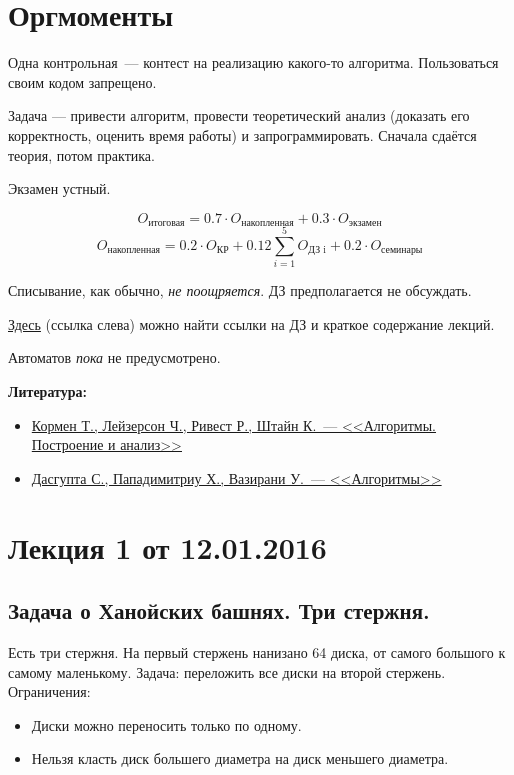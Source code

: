 



\section*{Оргмоменты}
Одна контрольная~--- контест на реализацию какого-то алгоритма. Пользоваться своим кодом запрещено.

Задача --- привести алгоритм, провести теоретический анализ (доказать его корректность, оценить время работы) и запрограммировать. Сначала сдаётся теория, потом практика.

Экзамен устный.

\[O_{\text{итоговая}} = 0.7 \cdot O_{\text{накопленная}}+0.3 \cdot O_{\text{экзамен}}\]
\[O_{\text{накопленная}} = 0.2 \cdot O_{\text{КР}} + 0.12 \sum\limits_{i = 1}^{5} O_{\text{ДЗ i}} + 0.2 \cdot O_{\text{семинары}}\]

Списывание, как обычно, \emph{не поощряется}. ДЗ предполагается не обсуждать.

\href{http://wiki.cs.hse.ru/}{Здесь} (ссылка слева) можно найти ссылки на ДЗ и краткое содержание лекций.

Автоматов \emph{пока} не предусмотрено.

\textbf{Литература:}
\begin{itemize}
    \item \href{https://yadi.sk/i/1enAa7YHmruFw}{Кормен Т., Лейзерсон Ч., Ривест Р., Штайн К.~--- <<Алгоритмы. Построение и анализ>>}
    \item \href{https://yadi.sk/i/E_0-SVipmrvPz}{Дасгупта С., Пападимитриу Х., Вазирани У.~--- <<Алгоритмы>>}
\end{itemize}

\section*{Лекция 1 от 12.01.2016}

\subsection*{Задача о Ханойских башнях. Три стержня.}
Есть три стержня. На первый стержень нанизано 64 диска, от самого большого к самому маленькому. Задача: переложить все диски на второй стержень. Ограничения:
\begin{itemize}
    \item Диски можно переносить только по одному.
    \item Нельзя класть диск большего диаметра на диск меньшего диаметра.
\end{itemize}


